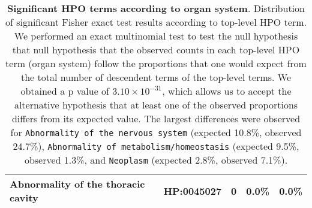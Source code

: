 \begin{table}
\begin{tabular}{>{\raggedright\arraybackslash}p{5.5cm}llll}
Abnormality of the thoracic cavity & HP:0045027 & 0 & 0.0\% & 0.0\%\\
\bottomrule
\end{tabular}
\caption{\textbf{Significant HPO terms according to organ system}. Distribution of significant Fisher exact test results according to top-level HPO term. We performed an exact multinomial test to test the null hypothesis that null hypothesis that the observed counts in each top-level HPO term (organ system) follow the proportions that one would expect from the total number of descendent terms of the top-level terms. We obtained a p value of $3.10\times 10^{-31}$, which allows us to accept the alternative hypothesis that at least one of the observed proportions differs from its expected value. The largest differences were observed for \texttt{Abnormality of the nervous system} (expected 10.8\%, observed 24.7\%), \texttt{Abnormality of metabolism/homeostasis} (expected 9.5\%, observed 1.3\%, and \texttt{Neoplasm} (expected 2.8\%, observed 7.1\%).}
\label{tab:to_do}
\end{table}